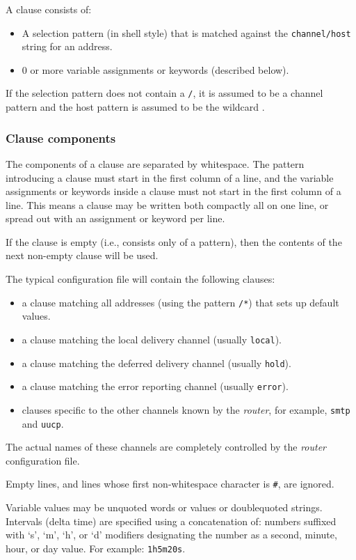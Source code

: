 A clause consists of:
\begin{itemize}
\item A selection pattern (in shell style) that is matched against the
{\tt channel/host} string for an address.
\item 0 or more variable assignments or keywords (described below).
\end{itemize}

If the selection pattern does not contain a {\tt /}, it is assumed to
be a channel pattern and the host pattern is assumed to be the wildcard
{\tt *}.




\subsubsection{Clause components}

The components of a clause are separated by whitespace. The pattern
introducing a clause must start in the first column of a line, and the
variable assignments or keywords inside a clause must not start in the
first column of a line. This means a clause may be written both compactly
all on one line, or spread out with an assignment or keyword per line.

If the clause is empty (i.e., consists only of a pattern), then the
contents of the next non-empty clause will be used.

The typical configuration file will contain the following clauses:
\begin{itemize}
\item a clause matching all addresses (using the pattern {\tt */*})
that sets up default values.
\item a clause matching the local delivery channel (usually {\tt local}).
\item a clause matching the deferred delivery channel (usually {\tt hold}).
\item a clause matching the error reporting channel (usually {\tt error}).
\item clauses specific to the other channels known by the {\em router\/},
for example, {\tt smtp} and {\tt uucp}.
\end{itemize}

The actual names of these channels are completely controlled by the
{\em router\/} configuration file.

Empty lines, and lines whose first non-whitespace character is {\tt \#},
are ignored.

Variable values may be unquoted words or values or doublequoted strings.
Intervals (delta time) are specified using a concatenation of: numbers
suffixed with `s', `m', `h', or `d' modifiers designating the number as
a second, minute, hour, or day value. For example: {\tt 1h5m20s}.




